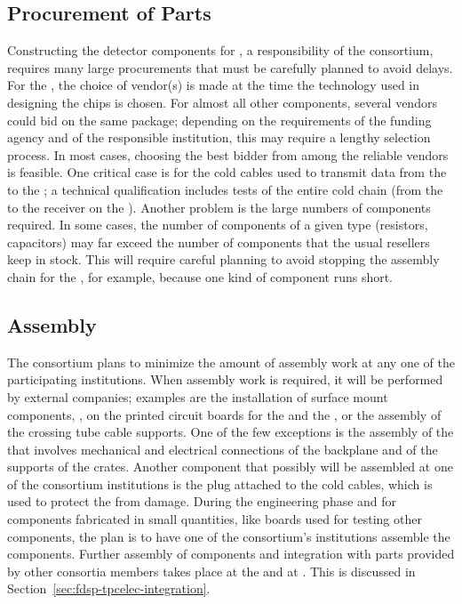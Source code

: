 \subsection{Procurement of Parts}
\label{sec:fdsp-tpcelec-production-procurement}

Constructing the detector components for , a
responsibility of the  consortium, requires many
large procurements that must be carefully planned to avoid
delays. For the , the choice of vendor(s)
is made at the time the technology
used in designing the chips is chosen. For almost all other components,
several vendors could bid on the same 
package; depending on the requirements of the funding
agency and of the responsible institution, this may require a lengthy
selection process. In most cases, choosing
the best bidder from among the reliable vendors is feasible. One critical case
is for the cold cables used to transmit data from the
 to the ; a technical qualification
includes tests of the entire cold chain (from the 
to the receiver on the ). Another 
problem is the large numbers of components
required. In some cases, the number of components of a given
type (resistors, capacitors) may far exceed the number of components
that the usual resellers keep in stock. This will 
require careful planning to avoid stopping the assembly chain for
the , for example, because 
one kind of component runs short.

\subsection{Assembly}
\label{sec:fdsp-tpcelec-production-assembly}

The  consortium plans to minimize
the amount of assembly work at any one of the participating
institutions. When assembly work is required, it will be performed
by external companies; examples are the installation of surface 
mount components, ,  on the printed 
circuit boards for the  and the , or
the assembly of the crossing tube cable supports. One of the few
exceptions is the assembly of the  that involves
mechanical and electrical connections of the backplane and of
the supports of the crates. Another component that possibly 
will be assembled at one of the consortium institutions is
the plug attached to the cold cables, which is used to protect 
the  from  damage. During the engineering
phase and for components fabricated in small quantities, 
like boards used for testing other components, the plan is to
have one of the consortium's institutions assemble the components.
Further assembly of components and integration with parts
provided by other consortia members takes place at the  and
at . This is discussed in Section~\ref{sec:fdsp-tpcelec-integration}.

